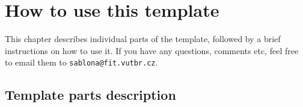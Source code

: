
%





\iffalse
\chapter{How to use this template}
\label{jak}

This chapter describes individual parts of the template, followed by a brief instructions on how to use it. If you have any questions, comments etc, feel free to email them to \texttt{sablona@fit.vutbr.cz}.

\section*{Template parts description}

